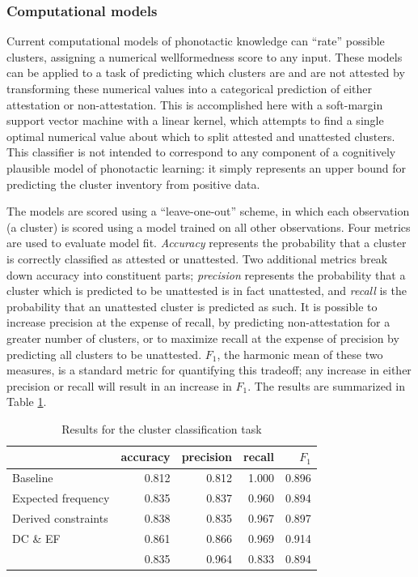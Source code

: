 \subsubsection{Computational models}

Current computational models of phonotactic knowledge can ``rate'' possible clusters, assigning a numerical wellformedness score to any input.
These models can be applied to a task of predicting which clusters are and are not attested by transforming these numerical values into a categorical prediction of either attestation or non-attestation.
This is accomplished here with a soft-margin support vector machine \citep{Cortes1995} with a linear kernel, which attempts to find a single optimal numerical value about which to split attested and unattested clusters.
This classifier is not intended to correspond to any component of a cognitively plausible model of phonotactic learning: it simply represents an upper bound for predicting the cluster inventory from positive data.

The models are scored using a ``leave-one-out'' scheme, in which each observation (a cluster) is scored using a model trained on all other observations.
Four metrics are used to evaluate model fit.
\emph{Accuracy} represents the probability that a cluster is correctly classified as attested or unattested.
Two additional metrics break down accuracy into constituent parts;
\emph{precision} represents the probability that a cluster which is predicted to be unattested is in fact unattested, and \emph{recall} is the probability that an unattested cluster is predicted as such.
It is possible to increase precision at the expense of recall, by predicting non-attestation for a greater number of clusters, or to maximize recall at the expense of precision by predicting all clusters to be unattested.
$F_1$, the harmonic mean of these two measures, is a standard metric for quantifying this tradeoff; any increase in either precision or recall will result in an increase in $F_1$.
The results are summarized in Table \ref{cmresults}.

\begin{table}
\centering
\begin{tabular}{l | rrrr}
\toprule
                    & accuracy & precision & recall & $F_1$ \\
\midrule
Baseline            & 0.812    & 0.812     & 1.000  & 0.896 \\
Expected frequency  & 0.835    & 0.837     & 0.960  & 0.894 \\
Derived constraints & 0.838    & 0.835     & 0.967  & 0.897 \\
DC \& EF            & 0.861    & 0.866     & 0.969  & 0.914 \\
\citet{Hayes2008a}  & 0.835    & 0.964     & 0.833  & 0.894 \\
\bottomrule
\end{tabular}
\caption{Results for the cluster classification task}
\label{cmresults}
\end{table}

